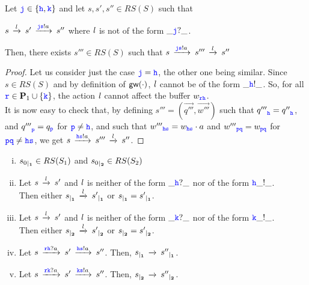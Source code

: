 \begin{lemma}
\label{lem:swap}
Let $\JJ\in\Set{\HH,\KK}$ and 
let $s,s',s''\in RS(S)$  such that\\
\centerline{$s\lts{\elle}s'\lts{\JJ\tts!a}s''$ where
$\elle$ is not of the form $\_\JJ?\_$.}
Then, there exists $s'''\in RS(S)$ such that $s\lts{\JJ\tts!a}s'''\lts{\elle}s''$
\end{lemma}

\begin{proof}
Let us consider just the case $\JJ=\HH$, the other one being similar.
Since $s\in RS(S)$ and by definition of $\gateway{\cdot}$, $\elle$ cannot be of the form $\_\HH!\_$.
So, for all $\ttr\in\roles_1\cup\Set{\KK}$, the action $\elle$ cannot affect the buffer ${w}_{\ttr\HH}$.\\
It is now easy to check that, by defining $s'''=(\vec{q'''},\vec{w'''})$ such that  
${q'''}_{\HH} = {q''}_{\HH}$,  and ${q'''}_{\ttp} = {q}_{\ttp}$ for $\ttp\neq \HH$,
and such that
${w'''}_{\HH\tts} = {w}_{\HH\tts}\cdot a$ and  ${w'''}_{\ttp\ttq} = {w}_{\ttp\ttq}$ for $\ttp\ttq\neq \HH\tts$, we get $s\lts{\HH\tts!a}s'''\lts{\elle}s''$.
\end{proof}




\begin{lemma}\hfill
\label{lem:indrestrict}
\begin{enumerate}[i)]
\item
$\restrict{s_0}{1}\in RS(S_1)$ and  $\restrict{s_0}{2}\in RS(S_2)$
\item
Let $s\lts{\elle}s'$ 
and $\elle$ is neither of the form $\_\HH?\_$ nor of the form $\HH\_!\_$.\\
Then either $\restrict{s}{1}\lts{\elle}\restrict{s'}{1}$ or  $\restrict{s}{1}=\restrict{s'}{1}$.
\item
Let $s\lts{\elle}s'$ 
and $\elle$ is neither of the form $\_\KK?\_$ nor of the form $\KK\_!\_$.\\
Then either $\restrict{s}{2}\lts{\elle}\restrict{s'}{2}$ or  $\restrict{s}{2}=\restrict{s'}{2}$.
\item
Let $s\lts{\ttr\HH?a} s'\lts{\HH\tts!a} s''$.
Then, $\restrict{s}{1}\lts{}\restrict{s''}{1}$.
\item
Let $s\lts{\ttr\KK?a} s'\lts{\KK\tts!a} s''$.
Then, $\restrict{s}{2}\lts{}\restrict{s''}{2}$.
\end{enumerate}
\end{lemma}

